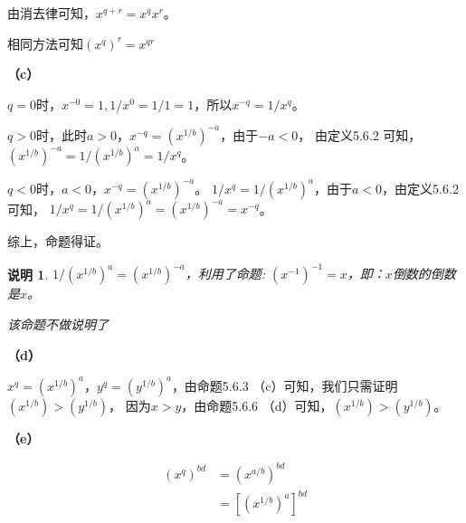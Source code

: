 \documentclass{article}
\theoremstyle{mystyle}
\newtheorem*{zremark}{说明}
\begin{document}
由消去律可知，$x^{q+r}=x^qx^r$。

相同方法可知$(x^q)^r = x^{qr}$

\textbf{（c）}

$q=0$时，$x^{-0}=1,1/x^0=1/1=1$，所以$x^{-q}=1/x^q$。

$q > 0$时，此时$a>0$，$x^{-q} = (x^{1/b})^{-a}$，由于$-a < 0$，
由定义5.6.2 可知，$(x^{1/b})^{-a} = 1/(x^{1/b})^{a} = 1/x^q$。

$q < 0$时，$a < 0$，$x^{-q} = (x^{1/b})^{-a}$。
$1/x^q = 1/(x^{1/b})^a$，由于$a<0$，由定义5.6.2 可知，
$1/x^q = 1/(x^{1/b})^a=(x^{1/b})^{-a}=x^{-q}$。

综上，命题得证。

\begin{zgraytheorem}
  \begin{zremark}
    $1/(x^{1/b})^a=(x^{1/b})^{-a}$，利用了命题: $(x^{-1})^{-1}=x$，即：$x$倒数的倒数是$x$。

    该命题不做说明了
  \end{zremark}
\end{zgraytheorem}

\textbf{（d）}

$x^q = (x^{1/b})^a$，$y^q=(y^{1/b})^a$，由命题5.6.3 （c）可知，我们只需证明$(x^{1/b})>(y^{1/b})$，
因为$x>y$，由命题5.6.6 （d）可知，$(x^{1/b})>(y^{1/b})$。

\textbf{（e）}

\begin{align*}
  (x^q)^{bd} & = (x^{a/b})^{bd}     \\
             & = [(x^{1/b})^a]^{bd} \\
\end{align*}
\end{document}
